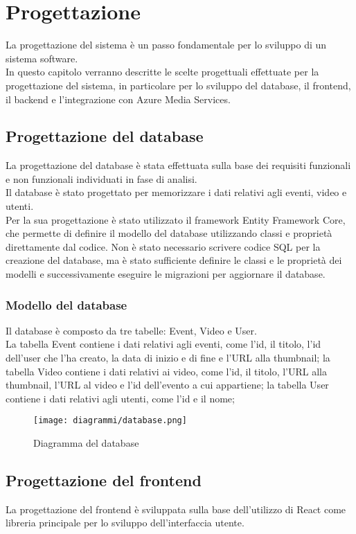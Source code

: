 \chapter{Progettazione}
\label{cap:progettazione}

La progettazione del sistema è un passo fondamentale per lo sviluppo di un sistema software.\\
In questo capitolo verranno descritte le scelte progettuali effettuate per la progettazione del sistema, in particolare per lo sviluppo del database, il frontend, il backend e l'integrazione con Azure Media Services.\\
\section{Progettazione del database}
La progettazione del database è stata effettuata sulla base dei requisiti funzionali e non funzionali individuati in fase di analisi.\\
Il database è stato progettato per memorizzare i dati relativi agli eventi, video e utenti.\\
Per la sua progettazione è stato utilizzato il framework Entity Framework Core, che permette di definire il modello del database utilizzando classi e proprietà direttamente dal codice. Non è stato necessario scrivere codice SQL per la creazione del database, ma è stato sufficiente definire le classi e le proprietà dei modelli e successivamente eseguire le migrazioni per aggiornare il database.\\
\subsection{Modello del database}
Il database è composto da tre tabelle: Event, Video e User.\\
La tabella Event contiene i dati relativi agli eventi, come l'id, il titolo, l'id dell'user che l'ha creato, la data di inizio e di fine e l'URL alla thumbnail; la tabella Video contiene i dati relativi ai video, come l'id, il titolo, l'URL alla thumbnail, l'URL al video e l'id dell'evento a cui appartiene; la tabella User contiene i dati relativi agli utenti, come l'id e il nome;
\begin{figure}[H] 
    \centering 
    \texttt{[image: diagrammi/database.png]} 
    \caption{Diagramma del database}
\end{figure}
\section{Progettazione del frontend}
La progettazione del frontend è sviluppata sulla base dell'utilizzo di React come libreria principale per lo sviluppo dell'interfaccia utente.
